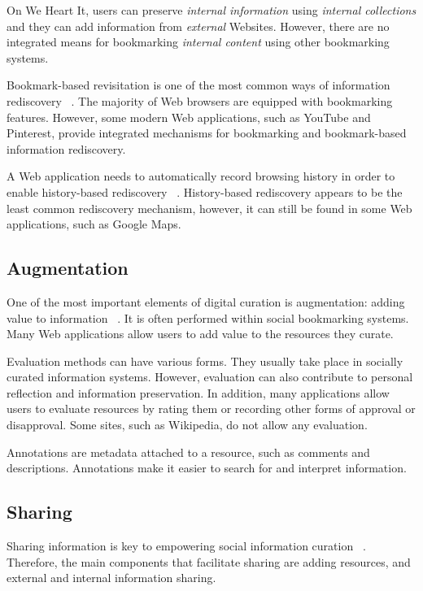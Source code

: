 {{On We Heart It, users can preserve \textit{internal  information} using \textit{internal collections} and they can add information from \textit{external} Websites. However, there are no integrated means for bookmarking \textit{internal content} using other bookmarking systems.  


Bookmark-based revisitation is one of the most common ways of information rediscovery ~\cite{abrams}. The majority of Web browsers are equipped with bookmarking features. However, some modern Web applications, such as YouTube and Pinterest, provide integrated mechanisms for bookmarking and bookmark-based information rediscovery. 

A Web application needs to automatically record browsing history in order to enable history-based rediscovery ~\cite{tauscher}. History-based rediscovery appears to be the least common rediscovery mechanism, however, it can still be found in some Web applications, such as Google Maps.
} %

{\subsection{Augmentation}
One of the most important elements of digital curation is augmentation: adding value to information ~\cite{beagrie, wittaker}. It is often performed within social bookmarking systems. Many Web applications allow users to add value to the resources they curate. 

Evaluation methods can have various forms. They usually take place in socially curated information systems. However, evaluation can also contribute to personal reflection and information preservation. In addition, many applications allow users to evaluate resources by rating them or recording other forms of approval or disapproval. Some sites, such as Wikipedia, do not allow any evaluation. 

Annotations are metadata attached to a resource, such as comments and descriptions. Annotations make it easier to search for and interpret information. 
} %

{\subsection{Sharing}
Sharing information is key to empowering social information curation ~\cite{beagrie}. Therefore, the main components that facilitate sharing are adding resources, and external and internal information sharing.

}}
